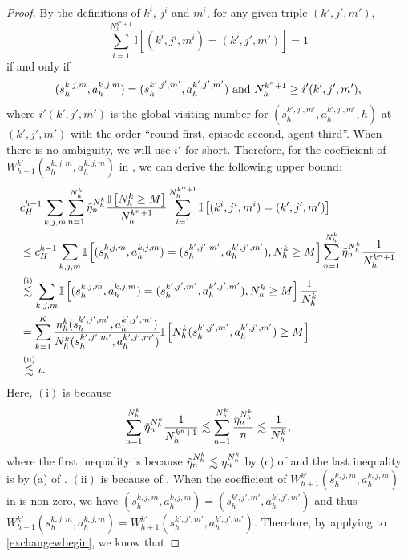 \documentclass{article}
\begin{document}
\begin{proof}
By the definitions of $k^i$, $j^i$ and $m^i$, for any given triple $(k',j',m')$, $$\sum_{i=1}^{N_h^{k^n+1}}\mathbb{I}\left[(k^i,j^i,m^i) = (k',j',m')\right] = 1$$ if and only if 
$$(s_h^{k,j,m}, a_h^{k,j,m}) = (s_h^{k',j',m'}, a_h^{k',j',m'}) \textnormal{ and } N_h^{k^n+1}\geq  i'(k',j',m'),$$
where $i'(k',j',m')$ is the global visiting number for $(s_h^{k',j',m'}, a_h^{k',j',m'}, h)$ at $(k',j',m')$ with the order ``round first, episode second, agent third”. When there is no ambiguity, we will use $i'$ for short. Therefore, for the coefficient of $W_{h+1}^{k'}(s_{h}^{k,j,m},a_{h}^{k,j,m})$ in , we can derive the following upper bound:
\begin{align}
    \label{coefW}
    &c_H^{h-1}\sum_{k,j,m}\sum_{n=1}^{N_h^k}\Tilde{\eta}_n^{N_h^k}\frac{\mathbb{I}\left[N_h^k\geq M\right]}{N_h^{k^n+1}} \sum_{i=1}^{N_h^{k^n+1}}\mathbb{I}\left[(k^i,j^i,m^i) = (k',j',m')\right] \nonumber\\
    &\leq c_H^{h-1}\sum_{k,j,m}\mathbb{I}\left[(s_h^{k,j,m}, a_h^{k,j,m}) = (s_h^{k',j',m'}, a_h^{k',j',m'}), N_h^k\geq M\right]\sum_{n=1}^{N_h^k}\Tilde{\eta}_n^{N_h^k}\frac{1}{N_h^{k^n+1}} \nonumber\\
    &\overset{\mathrm{(i)}}{\lesssim}\sum_{k,j,m}\mathbb{I}\left[(s_h^{k,j,m}, a_h^{k,j,m}) = (s_h^{k',j',m'}, a_h^{k',j',m'}), N_h^k\geq M\right]\frac{1}{N_h^{k}} \nonumber\\
    & = \sum_{k=1}^K\frac{n_h^k(s_h^{k',j',m'}, a_h^{k',j',m'})}{N_h^k(s_h^{k',j',m'}, a_h^{k',j',m'})}\mathbb{I}\left[N_h^k(s_h^{k',j',m'}, a_h^{k',j',m'})\geq M\right] \nonumber\\
     &\overset{\mathrm{(ii)}}{\lesssim} \iota. 
\end{align}
Here, $\mathrm{(i)}$ is because
\begin{equation*}
    \sum_{n=1}^{N_h^k}\Tilde{\eta}_n^{N_h^k}\frac{1}{N_h^{k^n+1}} \lesssim \sum_{n=1}^{N_h^k}\frac{\eta_n^{N_h^k}}{n} \lesssim \frac{1}{N_h^{k}},
\end{equation*}
where the first inequality is because $\Tilde{\eta}_n^{N_h^k} \lesssim \eta_n^{N_h^k}$ by (c) of  and the last inequality is by (a) of . $\mathrm{(ii)}$ is because of .  When the coefficient of $W_{h+1}^{k'}(s_{h}^{k,j,m},a_{h}^{k,j,m})$ in  is non-zero, we have $(s_h^{k,j,m}, a_h^{k,j,m}) = (s_h^{k',j',m'}, a_h^{k',j',m'})$ and thus $W_{h+1}^{k'}(s_{h}^{k,j,m},a_{h}^{k,j,m}) = W_{h+1}^{k'}(s_{h}^{k',j',m'},a_{h}^{k',j',m'})$. Therefore, by applying  to \cref{exchangewbegin}, we know that

\end{proof}
\end{document}

